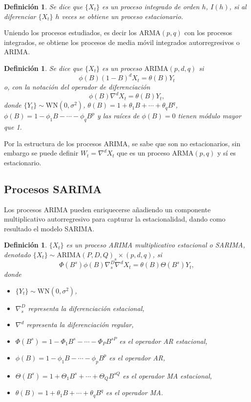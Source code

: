 \documentclass[12pt,twoside]{article}
\newtheorem{definition}[theorem]{Definición}
\newcommand{\arma}{\text{ARMA}}
\newcommand{\arima}{\text{ARIMA}}
\newcommand{\wn}{\text{WN}(0, \sigma^2)}
\begin{document}
\begin{definition}
    Se dice que $\{X_t\}$ es un proceso integrado de orden $h$, $I(h)$, si al diferenciar $\{X_t\}$ $h$ veces se obtiene un proceso estacionario.
\end{definition}

Uniendo los procesos estudiados, es decir los $\arma(p,q)$ con los procesos integrados, se obtiene los procesos de media móvil integrados autorregresivos o ARIMA.

\begin{definition}
    Se dice que $\{X_t\}$ es un proceso $\arima(p,d,q)$ si
    \begin{equation}\label{eq:ARIMA}
        \phi(B)(1-B)^d X_t = \theta(B) Y_t
    \end{equation}
    o, con la notación del operador de diferenciación
        \begin{equation}\label{eq:ARIMA2}
        \phi(B)\nabla^d X_t = \theta(B) Y_t,
    \end{equation}
    donde $\{Y_t\} \sim \wn$, $\theta(B) = 1 + \theta_1B + \dotsb + \theta_qB^q$, $\phi(B) = 1 - \phi_1B - \dotsb - \phi_qB^p$ y las raíces de $\phi(B) = 0$ tienen módulo mayor que 1.
\end{definition}

Por la estructura de los procesos ARIMA, se sabe que son no estacionarios, sin embargo se puede definir $W_t = \nabla^d X_t$ que es un proceso $\arma(p,q)$ y sí es estacionario.

\subsection{Procesos SARIMA}\label{sec:SARIMA}
Los procesos ARIMA pueden enriquecerse añadiendo un componente multiplicativo autorregresivo para capturar la estacionalidad, dando como resultado el modelo SARIMA.
\begin{definition}
    $\{X_t\}$ es un proceso ARIMA multiplicativo estacional o SARIMA, denotado $\{X_t\} \sim \arima(P,D,Q)_s\times (p,d,q)$, si
    \begin{equation}\label{eq:SARIMA}
        \Phi(B^s)\phi(B) \nabla_s^D \nabla^d X_t = \theta(B) \Theta(B^s) Y_t,
    \end{equation}
    donde
    \begin{itemize}
        \item $\{Y_t\} \sim \wn$,
        \item $\nabla_s^D$ representa la diferenciación estacional,
        \item $\nabla^d$ representa la diferenciación regular,
        \item $\Phi(B^s) = 1 - \Phi_1B^s - \dotsb - \Phi_PB^{sP}$ es el operador AR estacional,
        \item $\phi(B) = 1 - \phi_1B - \dotsb - \phi_pB^p$ es el operador AR,
        \item $\Theta(B^s) = 1 + \Theta_1B^s + \dotsb + \Theta_QB^{sQ}$ es el operador MA estacional,
        \item $\theta(B) = 1 + \theta_1B + \dotsb + \theta_qB^q$ es el operador MA.
    \end{itemize}
\end{definition}
\end{document}

